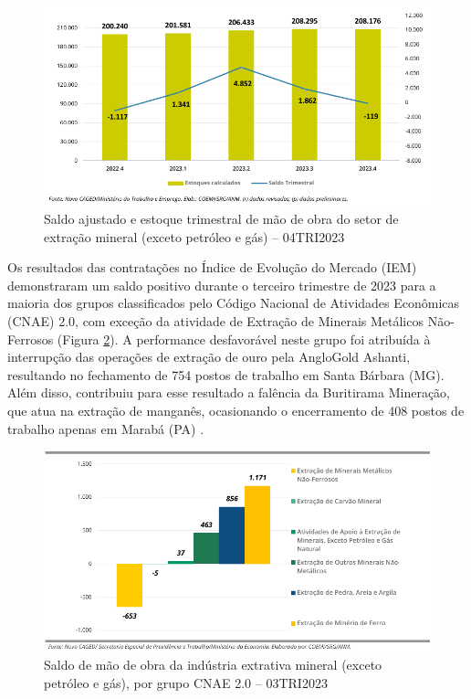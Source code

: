 \begin{figure}[!htb]
    \centering
    \includegraphics[width=\textwidth]{figures/image5_saldo_estoque_4tri2023.png}
    \caption{Saldo ajustado e estoque trimestral de mão de obra do setor de extração mineral (exceto petróleo e gás) -- 04TRI2023}
    \label{fig:saldo_estoque_4tri2023}
\end{figure}

Os resultados das contratações no Índice de Evolução do Mercado (IEM) demonstraram um saldo positivo durante o terceiro trimestre de 2023 para a maioria dos grupos classificados pelo Código Nacional de Atividades Econômicas (CNAE) 2.0, com exceção da atividade de Extração de Minerais Metálicos Não-Ferrosos (Figura \ref{fig:saldo_mao_obra_3tri2023}). A performance desfavorável neste grupo foi atribuída à interrupção das operações de extração de ouro pela AngloGold Ashanti, resultando no fechamento de 754 postos de trabalho em Santa Bárbara (MG). Além disso, contribuiu para esse resultado a falência da Buritirama Mineração, que atua na extração de manganês, ocasionando o encerramento de 408 postos de trabalho apenas em Marabá (PA) \cite{anm2023informe3}.

\begin{figure}[!htb]
    \centering
    \includegraphics[width=\textwidth]{figures/image6_saldo_mao_obra_3tri2023.png}
    \caption{Saldo de mão de obra da indústria extrativa mineral (exceto petróleo e gás), por grupo CNAE 2.0 -- 03TRI2023}
    \label{fig:saldo_mao_obra_3tri2023}
\end{figure}

